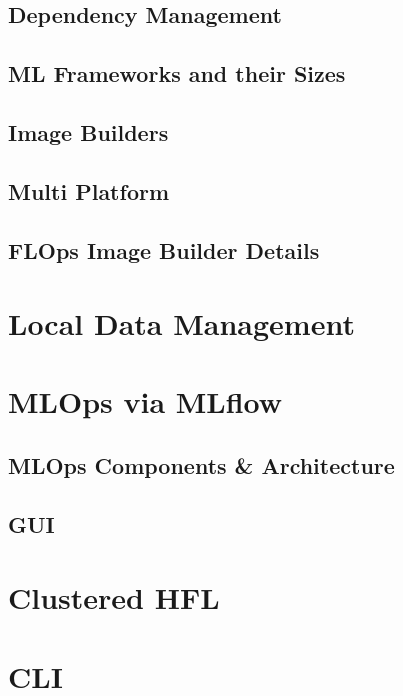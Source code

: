     \subsection{Dependency Management}

    \subsection{ML Frameworks and their Sizes}

    \subsection{Image Builders}

    \subsection{Multi Platform}

    \subsection{FLOps Image Builder Details}

\section{Local Data Management}

\section{MLOps via MLflow}

    \subsection{MLOps Components \& Architecture}

    \subsection{GUI}

\section{Clustered HFL}

\section{CLI}


